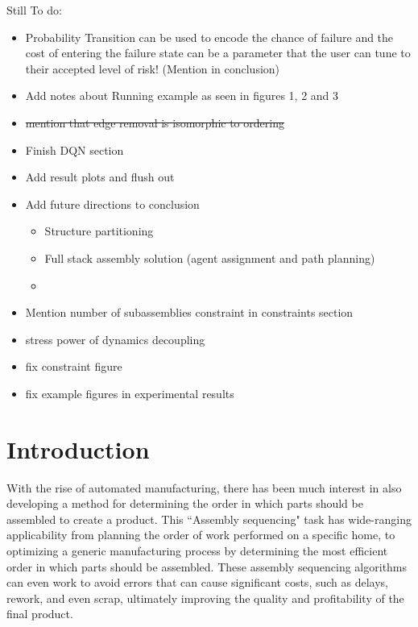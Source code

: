 \documentclass{article}
\begin{document}
{\color{red}Still To do}: 
\begin{itemize}
 \item Probability Transition can be used to encode the chance of failure and the cost of entering the failure state can be a parameter that the user can tune to their accepted level of risk! (Mention in conclusion)
 \item Add notes about Running example as seen in figures 1, 2 and 3
 \item \sout{mention that edge removal is isomorphic to ordering}
 \item Finish DQN section
 \item Add result plots and flush out
 \item Add future directions to conclusion
 \begin{itemize}
     \item Structure partitioning
     \item Full stack assembly solution (agent assignment and path planning)
     \item []
 \end{itemize}
 \item Mention number of subassemblies constraint in constraints section
 \item stress power of dynamics decoupling
 \item fix constraint figure
 \item fix example figures in experimental results
\end{itemize}




\section{Introduction}

With the rise of automated manufacturing, there has been much interest in also developing a method for determining the order in which parts should be assembled to create a product. This ``Assembly sequencing" task has wide-ranging applicability from planning the order of work performed on a specific home, to optimizing a generic manufacturing process by determining the most efficient order in which parts should be assembled. These assembly sequencing algorithms can even work to avoid errors that can cause significant costs, such as delays, rework, and even scrap, ultimately improving the quality and profitability of the final product.
\end{document}
